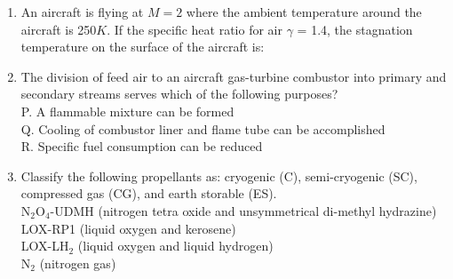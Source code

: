 \documentclass[journal,12pt,onecolumn]{IEEEtran}
\theoremstyle{remark}
\begin{document}
\begin{enumerate}
\begin{enumerate}
\end{enumerate}
\item An aircraft is flying at $M = 2$ where the ambient temperature around the aircraft is 250$K$. If the specific heat ratio for air $\gamma$ = 1.4, the stagnation temperature on the surface of the aircraft is:
\begin{enumerate}
\end{enumerate}
\item The division of feed air to an aircraft gas-turbine combustor into primary and secondary streams serves which of the following purposes?\\
P. A flammable mixture can be formed\\
Q. Cooling of combustor liner and flame tube can be accomplished\\
R. Specific fuel consumption can be reduced
\begin{enumerate}
\end{enumerate}
\item Classify the following propellants as: cryogenic (C), semi-cryogenic (SC), compressed gas (CG), and earth storable (ES).\\
N$_2$O$_4$-UDMH (nitrogen tetra oxide and unsymmetrical di-methyl hydrazine)\\
LOX-RP1 (liquid oxygen and kerosene)\\
LOX-LH$_2$ (liquid oxygen and liquid hydrogen)\\
N$_2$ (nitrogen gas)\\

\end{enumerate}
\end{document}
